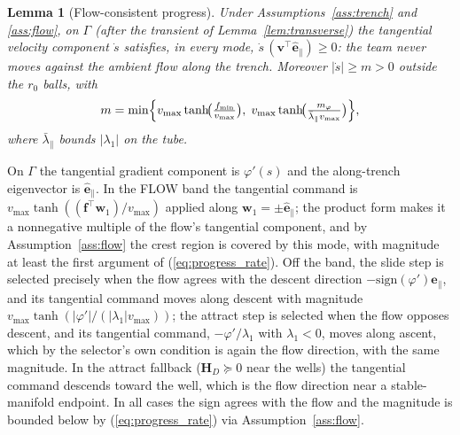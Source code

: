 \documentclass[lettersize,journal]{IEEEtran}
\newtheorem{lemma}{Lemma}
\begin{document}
\begin{lemma}[Flow-consistent progress]
\label{lem:progress}
Under Assumptions~\ref{ass:trench} and \ref{ass:flow}, on $\Gamma$
(after the transient of Lemma~\ref{lem:transverse}) the tangential
velocity component $\dot{s}$ satisfies, in every mode,
$\dot{s}\,(\mathbf{v}^\top \hat{\mathbf{e}}_\parallel) \geq 0$: the team
never moves against the ambient flow along the trench. Moreover
$|\dot{s}| \geq m > 0$ outside the $r_0$ balls, with
\begin{equation}
    m = \min\Bigl\{
    v_{\max}\tanh\!\bigl(\tfrac{f_{\min}}{v_{\max}}\bigr),\;
    v_{\max}\tanh\!\bigl(\tfrac{m_\varphi}
    {\bar{\lambda}_\parallel v_{\max}}\bigr)
    \Bigr\},
    \label{eq:progress_rate}
\end{equation}
where $\bar{\lambda}_\parallel$ bounds $|\lambda_1|$ on the tube.
\end{lemma}

\begin{IEEEproof}
On $\Gamma$ the tangential gradient component is $\varphi'(s)$ and the
along-trench eigenvector is $\hat{\mathbf{e}}_\parallel$. In the FLOW band
the tangential command is $v_{\max}\tanh((\mathbf{f}^\top
\mathbf{w}_1)/v_{\max})$ applied along $\mathbf{w}_1 = \pm
\hat{\mathbf{e}}_\parallel$; the product form makes it a nonnegative
multiple of the flow's tangential component, and by
Assumption~\ref{ass:flow} the crest region is covered by this mode, with
magnitude at least the first argument of (\ref{eq:progress_rate}). Off
the band, the slide step is selected precisely when the flow agrees with the
descent direction $-\mathrm{sign}(\varphi')\hat{\mathbf{e}}_\parallel$,
and its tangential command moves along descent with magnitude
$v_{\max}\tanh(|\varphi'|/(|\lambda_1| v_{\max}))$; the attract step is selected
when the flow opposes descent, and its tangential command,
$-\varphi'/\lambda_1$ with $\lambda_1 < 0$, moves along ascent, which by
the selector's own condition is again the flow direction, with the same
magnitude. In the attract fallback ($\mathbf{H}_D \succeq 0$ near the
wells) the tangential command descends toward the well, which is the
flow direction near a stable-manifold endpoint. In all cases the sign
agrees with the flow and the magnitude is bounded below by
(\ref{eq:progress_rate}) via Assumption~\ref{ass:flow}.
\end{IEEEproof}
\end{document}
